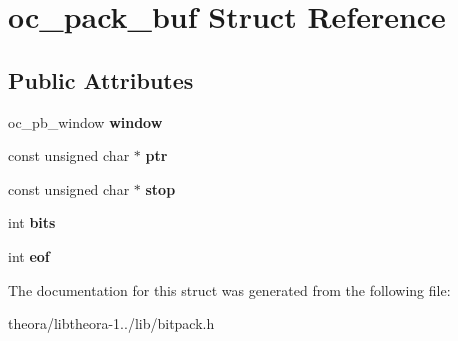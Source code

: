 \hypertarget{structoc__pack__buf}{\section{oc\+\_\+pack\+\_\+buf Struct Reference}
\label{structoc__pack__buf}
}
\subsection*{Public Attributes}
\begin{DoxyCompactItemize}
\item 
\hypertarget{structoc__pack__buf_af39f5af77ad7330a84f5cc4d7468c9d4}{oc\+\_\+pb\+\_\+window {\bfseries window}}\label{structoc__pack__buf_af39f5af77ad7330a84f5cc4d7468c9d4}

\item 
\hypertarget{structoc__pack__buf_a152b93dd664030909140c7bc5f184c6f}{const unsigned char $\ast$ {\bfseries ptr}}\label{structoc__pack__buf_a152b93dd664030909140c7bc5f184c6f}

\item 
\hypertarget{structoc__pack__buf_af0b049f4d58ff4733d2037bb14083813}{const unsigned char $\ast$ {\bfseries stop}}\label{structoc__pack__buf_af0b049f4d58ff4733d2037bb14083813}

\item 
\hypertarget{structoc__pack__buf_a07c016a3491e7fc16c28d3e1848acff6}{int {\bfseries bits}}\label{structoc__pack__buf_a07c016a3491e7fc16c28d3e1848acff6}

\item 
\hypertarget{structoc__pack__buf_a3a89fcd63bfa82a90cf5aa5725d39b5f}{int {\bfseries eof}}\label{structoc__pack__buf_a3a89fcd63bfa82a90cf5aa5725d39b5f}

\end{DoxyCompactItemize}


The documentation for this struct was generated from the following file\+:\begin{DoxyCompactItemize}
\item 
theora/libtheora-\/1../lib/bitpack.\+h\end{DoxyCompactItemize}
